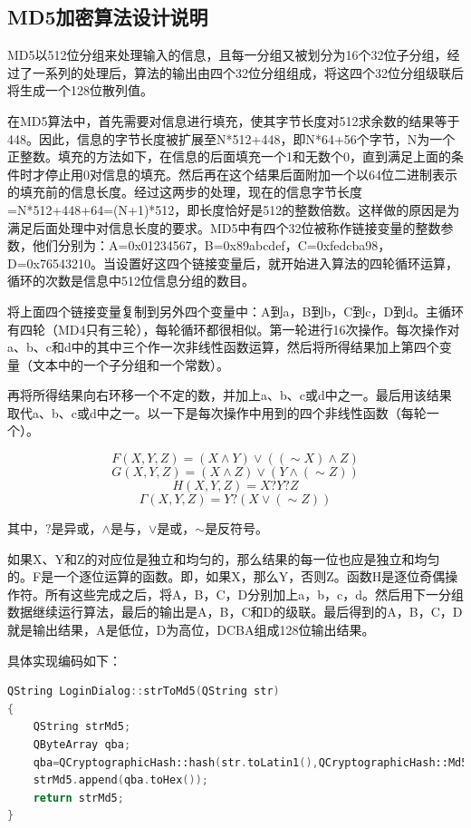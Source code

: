 \documentclass{progartcn}
\begin{document}
\subsection{MD5加密算法设计说明}

MD5以512位分组来处理输入的信息，且每一分组又被划分为16个32位子分组，经过了一系列的处理后，算法的输出由四个32位分组组成，将这四个32位分组级联后将生成一个128位散列值。

在MD5算法中，首先需要对信息进行填充，使其字节长度对512求余数的结果等于448。因此，信息的字节长度被扩展至N*512+448，即N*64+56个字节，N为一个正整数。填充的方法如下，在信息的后面填充一个1和无数个0，直到满足上面的条件时才停止用0对信息的填充。然后再在这个结果后面附加一个以64位二进制表示的填充前的信息长度。经过这两步的处理，现在的信息字节长度=N*512+448+64=(N+1)*512，即长度恰好是512的整数倍数。这样做的原因是为满足后面处理中对信息长度的要求。MD5中有四个32位被称作链接变量的整数参数，他们分别为：A=0x01234567，B=0x89abcdef，C=0xfedcba98，D=0x76543210。当设置好这四个链接变量后，就开始进入算法的四轮循环运算，循环的次数是信息中512位信息分组的数目。

将上面四个链接变量复制到另外四个变量中：A到a，B到b，C到c，D到d。主循环有四轮（MD4只有三轮），每轮循环都很相似。第一轮进行16次操作。每次操作对a、b、c和d中的其中三个作一次非线性函数运算，然后将所得结果加上第四个变量（文本中的一个子分组和一个常数）。

再将所得结果向右环移一个不定的数，并加上a、b、c或d中之一。最后用该结果取代a、b、c或d中之一。以一下是每次操作中用到的四个非线性函数（每轮一个）。

$$F(X,Y,Z)=(X\wedge Y)\vee ((\sim X)\wedge Z)$$
$$G(X,Y,Z)=(X\wedge Z)\vee (Y\wedge(\sim Z))$$
$$H(X,Y,Z)=X?Y?Z$$
$$\Gamma(X,Y,Z)=Y? (X\vee(\sim Z))$$

其中，$ ? $是异或，$\wedge $是与，$ \vee $是或，$ \sim $是反符号。

如果X、Y和Z的对应位是独立和均匀的，那么结果的每一位也应是独立和均匀的。F是一个逐位运算的函数。即，如果X，那么Y，否则Z。函数H是逐位奇偶操作符。所有这些完成之后，将A，B，C，D分别加上a，b，c，d。然后用下一分组数据继续运行算法，最后的输出是A，B，C和D的级联。最后得到的A，B，C，D就是输出结果，A是低位，D为高位，DCBA组成128位输出结果。

具体实现编码如下：

\begin{lstlisting}[language=c++]
QString LoginDialog::strToMd5(QString str)
{
	QString strMd5;
	QByteArray qba;
	qba=QCryptographicHash::hash(str.toLatin1(),QCryptographicHash::Md5);//调用QCryptographicHash类中生成密码散列的方法，生成二进制或文本数据的加密散列值
	strMd5.append(qba.toHex());
	return strMd5;
}	
\end{lstlisting}
\end{document}
